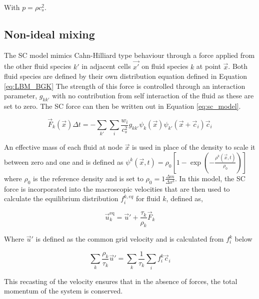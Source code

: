 With $p = \rho c_s^2$.

\subsection{Non-ideal mixing}
\label{section:lbm_non_ideal_mixing}

The SC model mimics Cahn-Hilliard type behaviour through a force applied from the other fluid species $k'$ in adjacent 
cells $\vec{x'}$ on fluid species $k$ at point $\vec{x}$. \cite{shan_lattice_1993, shan_simulation_1994, 
shan_multicomponent_1995, he_discrete_1998, jansen_bijels_2011, chin_lattice_2002} Both fluid species are defined
by their own distribution equation defined in Equation \ref{eq:LBM_BGK} The strength of this force is controlled 
through an interaction parameter, $g_{kk'}$ with no contribution from self interaction of the fluid as these are 
set to zero. The SC force can then be written out in Equation \ref{eq:sc_model}.

\begin{equation}
\vec{F}_k(\vec{x}) \Delta t = - \sum_{k'} \sum_i \frac{w_i}{c_s^2} g_{kk'} \psi_k(\vec{x})\psi_{k'}(\vec{x}+\vec{c}_i) \vec{c}_i
\label{eq:sc_model}
\end{equation}

An effective mass of each fluid at node $\vec{x}$ is used in place of the density to scale it between zero 
and one and is defined as $\psi^{k}(\vec{x},t) = \rho_{0}\left[1 - \exp(-\frac{\rho^{k}(\vec{x}, t)}{\rho_{0}})\right]$ where
$\rho_0$ is the reference density and is set to $\rho_0 = 1 \frac{\Delta m}{\Delta x^3}$. 
In this model, the SC force is incorporated into the macroscopic velocities that are then used to calculate the equilibrium
distribution $f_{i}^{k, eq}$ for fluid $k$, defined as,

\begin{equation}
\vec{u}_k^{\text{eq}} = \vec{u}' + \frac{\tau_k}{\rho_k} \vec{F}_k
\end{equation}

Where $\vec{u}'$ is defined as the common grid velocity and is calculated from $f_i^k$ below

\begin{equation}
    \sum_k \frac{\rho_k}{\tau_k} \vec{u}' = \sum_k \frac{1}{\tau_k}\sum_i f_i^k\vec{c}_i
\end{equation}

This recasting of the velocity ensures that in the absence of forces, the total momentum of the system is conserved. 

